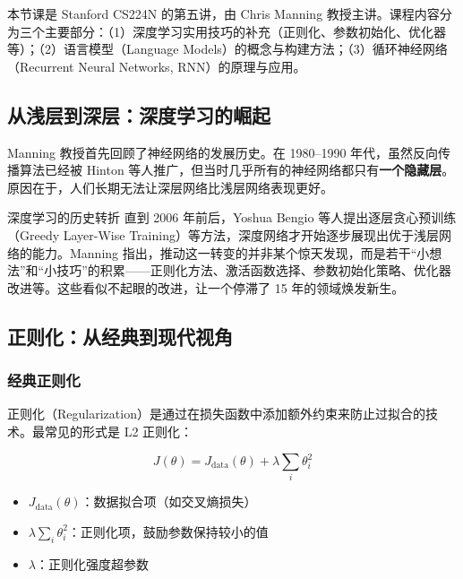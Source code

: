 \documentclass[a4paper]{article}
\begin{document}
本节课是 Stanford CS224N 的第五讲，由 Chris Manning 教授主讲。课程内容分为三个主要部分：（1）深度学习实用技巧的补充（正则化、参数初始化、优化器等）；（2）语言模型（Language Models）的概念与构建方法；（3）循环神经网络（Recurrent Neural Networks, RNN）的原理与应用。





\subsection{从浅层到深层：深度学习的崛起}

Manning 教授首先回顾了神经网络的发展历史。在 1980--1990 年代，虽然反向传播算法已经被 Hinton 等人推广，但当时几乎所有的神经网络都只有\textbf{一个隐藏层}。原因在于，人们长期无法让深层网络比浅层网络表现更好。





\begin{knowledgebox}{深度学习的历史转折}
直到 2006 年前后，Yoshua Bengio 等人提出逐层贪心预训练（Greedy Layer-Wise Training）等方法，深度网络才开始逐步展现出优于浅层网络的能力。Manning 指出，推动这一转变的并非某个惊天发现，而是若干``小想法''和``小技巧''的积累——正则化方法、激活函数选择、参数初始化策略、优化器改进等。这些看似不起眼的改进，让一个停滞了 15 年的领域焕发新生。
\end{knowledgebox}

\subsection{正则化：从经典到现代视角}

\subsubsection{经典正则化}

正则化（Regularization）是通过在损失函数中添加额外约束来防止过拟合的技术。最常见的形式是 L2 正则化：

$$J(\theta) = J_{\text{data}}(\theta) + \lambda \sum_i \theta_i^2$$

\begin{itemize}
    \item $J_{\text{data}}(\theta)$：数据拟合项（如交叉熵损失）
    \item $\lambda \sum_i \theta_i^2$：正则化项，鼓励参数保持较小的值
    \item $\lambda$：正则化强度超参数
\end{itemize}
\end{document}
